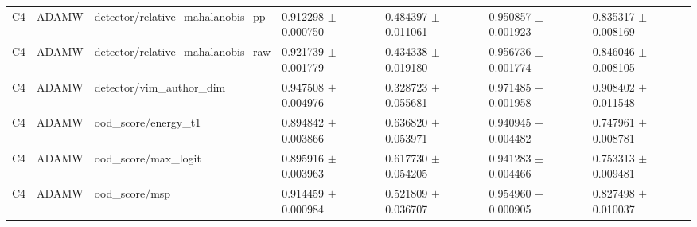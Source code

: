 \begin{longtable}{lllllll}
C4 & ADAMW & detector/relative\_mahalanobis\_pp & 0.912298 $\pm$ 0.000750 & 0.484397 $\pm$ 0.011061 & 0.950857 $\pm$ 0.001923 & 0.835317 $\pm$ 0.008169 \\
C4 & ADAMW & detector/relative\_mahalanobis\_raw & 0.921739 $\pm$ 0.001779 & 0.434338 $\pm$ 0.019180 & 0.956736 $\pm$ 0.001774 & 0.846046 $\pm$ 0.008105 \\
C4 & ADAMW & detector/vim\_author\_dim & 0.947508 $\pm$ 0.004976 & 0.328723 $\pm$ 0.055681 & 0.971485 $\pm$ 0.001958 & 0.908402 $\pm$ 0.011548 \\
C4 & ADAMW & ood\_score/energy\_t1 & 0.894842 $\pm$ 0.003866 & 0.636820 $\pm$ 0.053971 & 0.940945 $\pm$ 0.004482 & 0.747961 $\pm$ 0.008781 \\
C4 & ADAMW & ood\_score/max\_logit & 0.895916 $\pm$ 0.003963 & 0.617730 $\pm$ 0.054205 & 0.941283 $\pm$ 0.004466 & 0.753313 $\pm$ 0.009481 \\
C4 & ADAMW & ood\_score/msp & 0.914459 $\pm$ 0.000984 & 0.521809 $\pm$ 0.036707 & 0.954960 $\pm$ 0.000905 & 0.827498 $\pm$ 0.010037 \\
\end{longtable}
